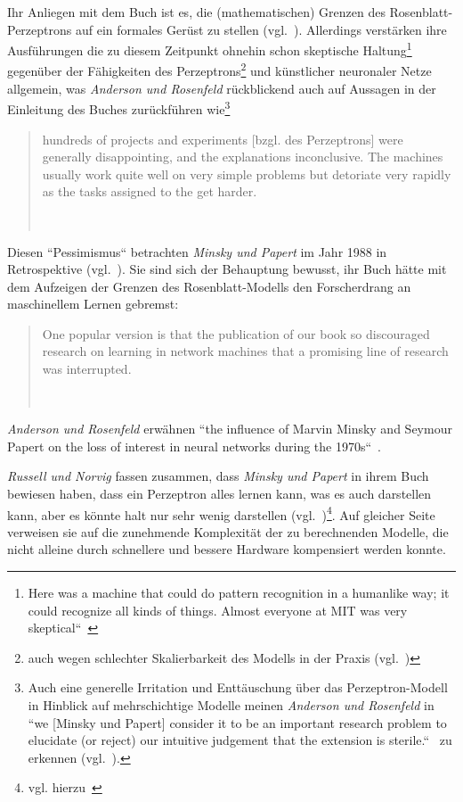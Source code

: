 Ihr Anliegen mit dem Buch ist es, die (mathematischen) Grenzen des Rosenblatt-Perzeptrons auf ein formales Gerüst zu stellen (vgl.~\cite[249]{MP88}).
Allerdings verstärken ihre Ausführungen die zu diesem Zeitpunkt ohnehin schon skeptische Haltung\footnote{
    Here was a machine that could do pattern recognition in a humanlike way; it could recognize all kinds of things. Almost everyone at MIT was very skeptical``~\cite[99]{AR98}
} gegenüber der Fähigkeiten des Perzeptrons\footnote{
    auch wegen schlechter Skalierbarkeit des Modells in der Praxis (vgl.~\cite[159]{AR88})
} und künstlicher neuronaler Netze allgemein, was \textit{Anderson und Rosenfeld} rückblickend auch auf Aussagen in der Einleitung des Buches zurückführen wie\footnote{
    Auch eine generelle Irritation und Enttäuschung über das Perzeptron-Modell in Hinblick auf mehrschichtige Modelle meinen \textit{Anderson und Rosenfeld} in ``we [Minsky und Papert] consider it to be an important research problem to elucidate (or reject) our intuitive judgement that the extension is sterile.``~\cite[232]{MP88} zu erkennen (vgl.~\cite[159]{AR88}).
}

\blockquote[{~\cite[19]{MP88}}]{
    hundreds of projects and experiments [bzgl. des Perzeptrons] were generally disappointing, and the explanations inconclusive. The machines usually work quite well on very simple problems but detoriate very rapidly as the tasks assigned to the get harder.
}

\noindent
Diesen ``Pessimismus`` betrachten \textit{Minsky und Papert} im Jahr 1988 in Retrospektive (vgl.~\cite[xiii]{MP88}). Sie sind sich der Behauptung bewusst, ihr Buch hätte mit dem Aufzeigen der Grenzen des Rosenblatt-Modells den Forscherdrang an maschinellem Lernen gebremst:

\blockquote[{~\cite[xii]{MP88}}]{
    One popular version is  that the publication of our book so discouraged research on learning in network machines that a promising line of research was interrupted.
}

\noindent
\textit{Anderson und Rosenfeld} erwähnen ``the influence of Marvin Minsky and Seymour Papert on the loss of interest in neural networks during the 1970s``~\cite[X]{AR98}.

\textit{Russell und Norvig} fassen zusammen, dass \textit{Minsky und Papert} in ihrem Buch bewiesen haben, dass ein Perzeptron alles lernen kann, was es auch darstellen kann, aber es könnte halt nur sehr wenig darstellen (vgl.~\cite[45]{RN09})\footnote{
    vgl. hierzu~\cite[xiii]{MP88}
}.
Auf gleicher Seite verweisen sie auf die zunehmende Komplexität der zu berechnenden Modelle, die nicht alleine durch schnellere und bessere Hardware kompensiert werden konnte.

